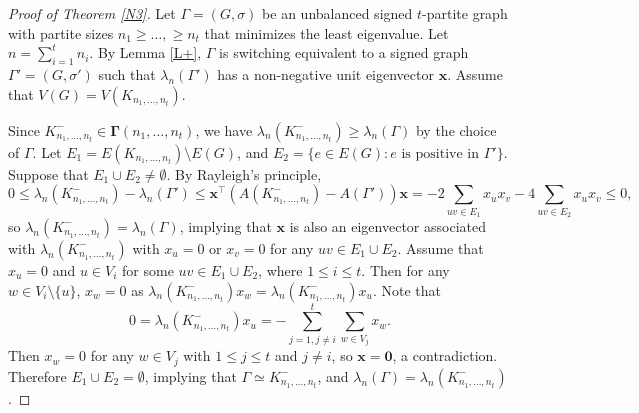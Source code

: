 \documentclass[10pt,a4paper]{amsart}
\numberwithin{equation}{section}
\begin{document}
\begin{proof} [Proof of Theorem \ref{N3}]
Let $\Gamma=(G, \sigma)$ be an unbalanced signed $t$-partite graph with partite sizes $n_1\ge \dots, \ge n_t$ that minimizes the least eigenvalue. 
Let $n=\sum_{i=1}^{t}n_i$. 
By Lemma \ref{L+},  $\Gamma$ is switching equivalent to
a signed graph $\Gamma'=(G,\sigma')$  such that $\lambda_n(\Gamma')$ has a non-negative unit eigenvector $\mathbf{x}$. Assume that $V(G)=V(K_{n_1, \dots, n_t})$.


Since $K_{n_1, \dots, n_t}^-\in \boldsymbol\Gamma(n_1,\dots, n_t)$, we have $\lambda_n(K_{n_1, \dots, n_t}^-)\ge\lambda_n(\Gamma)$ by the choice of $\Gamma$. 
Let $E_1=E(K_{n_1, \dots, n_t})\setminus E(G)$, and 
$E_2=\{e\in E(G): \mbox{$e$ is positive in $\Gamma'$}\}$. 
Suppose that $E_1\cup E_2\ne \emptyset$. 
By Rayleigh's principle,  
\[
0\le \lambda_n(K_{n_1, \dots, n_t}^-)-\lambda_n(\Gamma')\le \mathbf{x}^\top\left(A(K_{n_1, \dots, n_t}^-)-A(\Gamma')\right)\mathbf{x}=-2\sum_{uv\in E_1}x_ux_v-4\sum_{uv\in E_2}x_ux_v\le 0,  
\]
so $\lambda_n(K_{n_1, \dots, n_t}^-)=\lambda_n(\Gamma)$, implying that $\mathbf{x}$ is also an eigenvector associated with $\lambda_n(K_{n_1,\dots,n_t}^-)$ with $x_u=0$ or $x_v=0$ for any $uv\in E_1\cup E_2$. Assume that $x_u=0$ and $u\in V_i$ for some $uv\in E_1\cup E_2$, where $1\le i\le t$. 
Then for any $w\in V_i\setminus\{u\}$, $x_w=0$ as $\lambda_n(K_{n_1,\dots,n_t}^-)x_w=\lambda_n(K_{n_1,\dots,n_t}^-)x_u$. 
Note that
\[
0=\lambda_n(K_{n_1,\dots,n_t}^-)x_u=-\sum_{j=1,j\ne i}^t\sum_{w\in V_j}x_w. 
\]
Then $x_w=0$ for any $w\in V_j$ with $1\le j\le t$ and $j\ne i$, so $\mathbf{x}=\mathbf{0}$, a contradiction. 
Therefore $E_1\cup E_2=\emptyset$, implying that $\Gamma\simeq K_{n_1, \dots, n_t}^-$, and $\lambda_n(\Gamma)=\lambda_n\left(K_{n_1, \dots, n_t}^-\right)$.
%
%

\end{proof}
\end{document}
